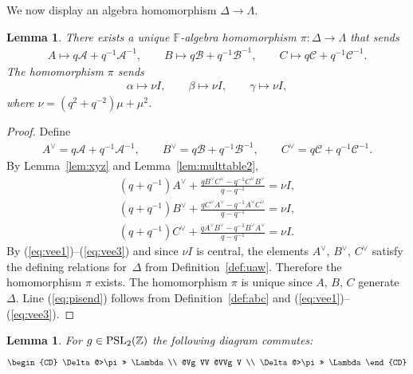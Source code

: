 \documentclass[pdftex]{sigma}
\numberwithin{equation}{section}
\newtheorem{Lemma}[Theorem]{Lemma}
\begin{document}
We now display an algebra homomorphism $\Delta \to \Lambda $.

\begin{Lemma}
\label{prop:uhomoh}
There exists a unique $\mathbb F$-algebra homomorphism
$\pi:\Delta \to \Lambda $
 that sends
\begin{gather*}
A \mapsto q \mathcal A+q^{-1}{\mathcal A}^{-1},
 \qquad
B \mapsto q \mathcal B+q^{-1}{\mathcal B}^{-1},
\qquad
C \mapsto q\mathcal C+q^{-1}{\mathcal C}^{-1}.
\end{gather*}
The homomorphism $\pi$ sends
\begin{gather}
 \alpha \mapsto \nu I,
 \qquad
\beta \mapsto  \nu I,
 \qquad
\gamma \mapsto \nu I,
\label{eq:pisend}
\end{gather}
where $\nu= (q^2+q^{-2})\mu + \mu^2$.
\end{Lemma}

\begin{proof}
Def\/ine
\begin{gather*}
A^\vee = q\mathcal A+q^{-1}{\mathcal A}^{-1},
\qquad
B^\vee =q\mathcal B+q^{-1}{\mathcal B}^{-1},
\qquad
C^\vee = q\mathcal C+q^{-1}{\mathcal C}^{-1}.
\end{gather*}
By Lemma~\ref{lem:xyz}
and Lemma~\ref{lem:multtable2},
\begin{gather}
(q+q^{-1})A^\vee+ \frac{qB^\vee C^\vee-q^{-1}C^\vee B^\vee}{q-q^{-1}}
  = \nu I,
\label{eq:vee1}
\\
(q+q^{-1})B^\vee+
\frac{qC^\vee A^\vee -q^{-1}A^\vee C^\vee }{q-q^{-1}}
 =  \nu I,
\label{eq:vee2}
\\
(q+q^{-1})C^\vee +
\frac{qA^\vee B^\vee -q^{-1}B^\vee A^\vee }{q-q^{-1}}
 =  \nu I.
\label{eq:vee3}
\end{gather}
By
(\ref{eq:vee1})--(\ref{eq:vee3}) and
since
 $\nu I$ is central, the elements
$A^\vee$, $B^\vee$, $C^\vee$ satisfy the
def\/ining relations for~$\Delta $ from
Def\/inition~\ref{def:uaw}.
Therefore
the homomorphism $\pi$ exists. The homomorphism $\pi$
is unique since $A$, $B$, $C$ generate~$\Delta $. Line
(\ref{eq:pisend})
follows from
Def\/inition~\ref{def:abc} and
(\ref{eq:vee1})--(\ref{eq:vee3}).
\end{proof}



\begin{Lemma}
\label{lem:comdiagf}
For $g \in
{\rm  {PSL}}_2(\mathbb Z)$
 the following diagram commutes:
\[
\begin{CD}
\Delta  @>\pi>>
         \Lambda  \\
	  @Vg VV                     @VVg V \\
	 \Delta
	  @>\pi>>
	          \Lambda
		    \end{CD}
		    \]

\end{Lemma}
\end{document}
